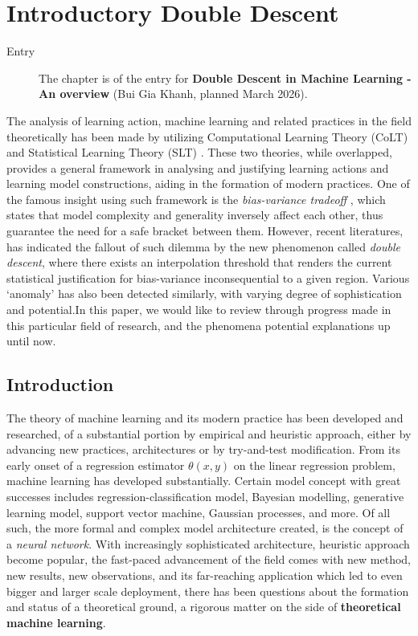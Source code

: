 \chapter{Introductory Double Descent}
\begin{description}
  \item[Entry] The chapter is of the entry for \textbf{Double Descent in Machine Learning - An overview} (Bui Gia Khanh, planned March 2026). 
\end{description}

The analysis of learning action, machine learning and related practices in the field theoretically has been made by utilizing Computational Learning Theory (CoLT) \cite{10.1145/1968.1972} and Statistical Learning Theory (SLT) \cite{Vapnik1999-VAPTNO}. These two theories, while overlapped, provides a general framework in analysing and justifying learning actions and learning model constructions, aiding in the formation of modern practices. One of the famous insight using such framework is the \textit{bias-variance tradeoff} \cite{6797087}, which states that model complexity and generality inversely affect each other, thus guarantee the need for a safe bracket between them. However, recent literatures, \cite{belkin_reconciling_2019} has indicated the fallout of such dilemma by the new phenomenon called \textit{double descent}, where there exists an interpolation threshold that renders the current statistical justification for bias-variance inconsequential to a given region. Various `anomaly' has also been detected similarly, with varying degree of sophistication and potential.In this paper, we would like to review through progress made in this particular field of research, and the phenomena potential explanations up until now. 

\section{Introduction}

The theory of machine learning and its modern practice has been developed and researched, of a substantial portion by empirical and heuristic approach, either by advancing new practices, architectures or by try-and-test modification. From its early onset of a regression estimator $\theta(x,y)$ on the linear regression problem, machine learning has developed substantially. Certain model concept with great successes includes regression-classification model, Bayesian modelling, generative learning model, support vector machine, Gaussian processes, and more. Of all such, the more formal and complex model architecture created, is the concept of a \textit{neural network}. With increasingly sophisticated architecture, heuristic approach become popular, the fast-paced advancement of the field comes with new method, new results, new observations, and its far-reaching application which led to even bigger and larger scale deployment, there has been questions about the formation and status of a theoretical ground, a rigorous matter on the side of \textbf{theoretical machine learning}.

